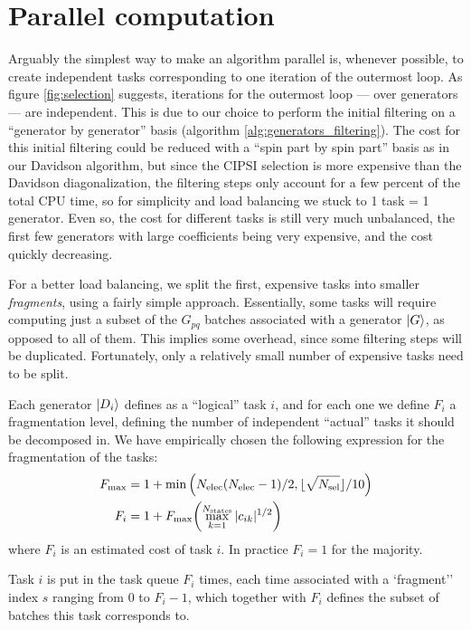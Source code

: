\documentclass[./thesis.tex]{subfiles}
\begin{document}
\clearpage
\section{Parallel computation}

Arguably the simplest way to make an algorithm parallel is, whenever possible, to create independent tasks corresponding to one iteration of the outermost loop.
As figure \ref{fig:selection} suggests, iterations for the outermost loop --- over generators --- are independent. This is due to our choice to perform the initial filtering on a ``generator by generator'' basis (algorithm \ref{alg:generators_filtering}). The cost for this initial filtering could be reduced with a ``spin part by spin part'' basis as in our Davidson algorithm, but since the CIPSI selection is more expensive than the Davidson diagonalization, the filtering steps only account for a few percent of the total CPU time, so for simplicity and load balancing we stuck to 1 task = 1 generator. Even so, the cost for different tasks is still very much unbalanced, the first few generators with large coefficients being very expensive, and the cost quickly decreasing.

For a better load balancing, we split the first, expensive tasks into smaller \emph{fragments}, using a fairly simple approach. Essentially, some tasks will require computing just a subset of the ${G_{pq}}$ batches associated with a generator $\ket G$, as opposed to all of them. This implies some overhead, since some filtering steps will be duplicated. Fortunately, only a relatively small number of expensive tasks need to be split.


Each generator $\ket {D_i}$ defines as a ``logical'' task $i$, and for each one we define $F_i$ a fragmentation level, defining the number of independent ``actual'' tasks it should be decomposed in.
We have empirically chosen the following expression for the fragmentation of the tasks:
\begin{align}
F_{\max} & = 1 + \min \qty( {N_\text{elec}} ({N_\text{elec}}-1)/2, \lfloor \sqrt{{N_\text{sel}}} \rfloor/10 ) \\
F_i & = 1 + F_{\max} \qty( \max_{k=1}^{{N_\text{states}}} |c_{ik}|^{1/2} )
\end{align}
where $F_i$ is an estimated cost of task $i$. In practice $F_i = 1$ for the majority.

Task $i$ is put in the task queue $F_i$ times, each time associated with a `fragment'' index $s$ ranging from $0$ to $F_i-1$, which together with $F_i$ defines the subset of batches this task corresponds to.
 
\end{document}
